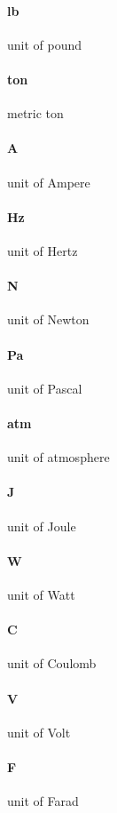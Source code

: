 \paragraph{lb}
unit of pound


\paragraph{ton}
metric ton


\paragraph{A}
unit of Ampere


\paragraph{Hz}
unit of Hertz


\paragraph{N}
unit of Newton


\paragraph{Pa}
unit of Pascal


\paragraph{atm}
unit of atmosphere


\paragraph{J}
unit of Joule


\paragraph{W}
unit of Watt


\paragraph{C}
unit of Coulomb


\paragraph{V}
unit of Volt


\paragraph{F}
unit of Farad


